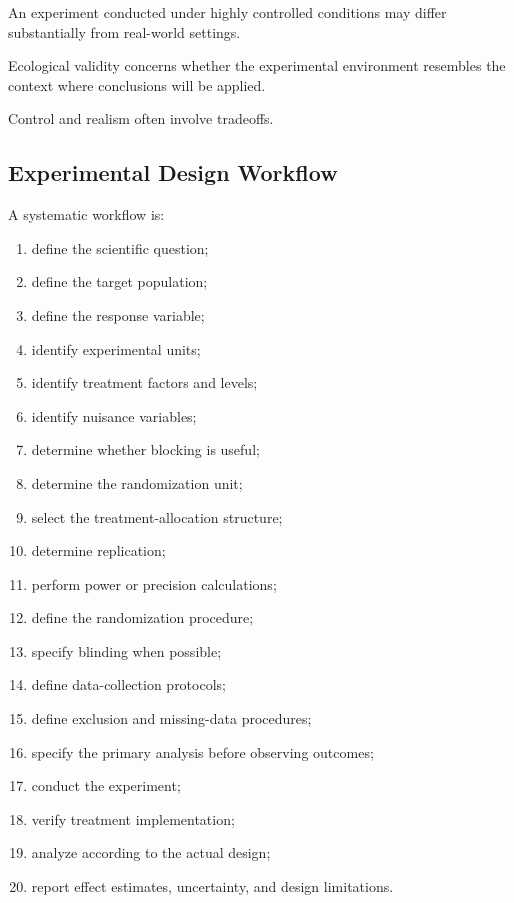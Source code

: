 An experiment conducted under highly controlled conditions may differ
substantially from real-world settings.

Ecological validity concerns whether the experimental environment
resembles the context where conclusions will be applied.

Control and realism often involve tradeoffs.

\subsection{Experimental Design Workflow}
\label{subsec:experimental-design-workflow}

A systematic workflow is:

\begin{enumerate}
    \item define the scientific question;
    \item define the target population;
    \item define the response variable;
    \item identify experimental units;
    \item identify treatment factors and levels;
    \item identify nuisance variables;
    \item determine whether blocking is useful;
    \item determine the randomization unit;
    \item select the treatment-allocation structure;
    \item determine replication;
    \item perform power or precision calculations;
    \item define the randomization procedure;
    \item specify blinding when possible;
    \item define data-collection protocols;
    \item define exclusion and missing-data procedures;
    \item specify the primary analysis before observing outcomes;
    \item conduct the experiment;
    \item verify treatment implementation;
    \item analyze according to the actual design;
    \item report effect estimates, uncertainty, and design limitations.
\end{enumerate}

